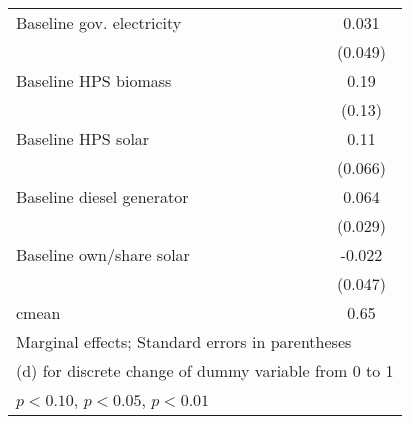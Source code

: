 \begin{table}[htbp]
\begin{tabular*}{1\hsize}{@{\hskip\tabcolsep\extracolsep\fill}l*{5}{c}}
Baseline gov. electricity&                  &                  &                  &                  &    0.031         \\
                &                  &                  &                  &                  &  (0.049)         \\
Baseline HPS biomass&                  &                  &                  &                  &     0.19         \\
                &                  &                  &                  &                  &   (0.13)         \\
Baseline HPS solar&                  &                  &                  &                  &     0.11         \\
                &                  &                  &                  &                  &  (0.066)         \\
Baseline diesel generator&                  &                  &                  &                  &    0.064\sym{**} \\
                &                  &                  &                  &                  &  (0.029)         \\
Baseline own/share solar&                  &                  &                  &                  &   -0.022         \\
                &                  &                  &                  &                  &  (0.047)         \\
\midrule
cmean           &                  &                  &                  &                  &     0.65         \\
\bottomrule
\multicolumn{6}{l}{\footnotesize Marginal effects; Standard errors in parentheses}\\
\multicolumn{6}{l}{\footnotesize  (d) for discrete change of dummy variable from 0 to 1}\\
\multicolumn{6}{l}{\footnotesize \sym{*} \(p<0.10\), \sym{**} \(p<0.05\), \sym{***} \(p<0.01\)}\\
\end{tabular*}
\end{table}
